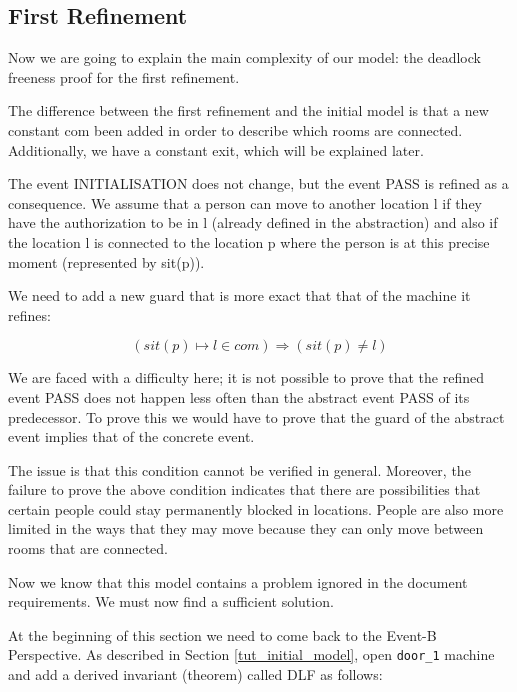 \subsection{First Refinement}
\label{tut_location_first_refinement}

Now we are going to explain the main complexity of our model: the deadlock freeness proof for the first refinement. 

The difference between the first refinement and the initial model is that a new constant \textsf{com} been added in order to describe which rooms are connected. Additionally, we have a constant \textsf{exit}, which will be explained later. 

The event \textsf{INITIALISATION} does not change, but the event \textsf{PASS} is refined as a consequence. We assume that a person can move to another location l if they have the authorization to be in l (already defined in the abstraction) and also if the location l is connected to the location p where the person is at this precise moment (represented by sit(p)).

We need to add a new guard that is more exact that that of the machine it refines:

\[
( sit(p) \mapsto l \in com ) \Rightarrow ( sit(p)\neq l )
\]

We are faced with a difficulty here; it is not possible to prove that the refined event \textsf{PASS} does not happen less often than the abstract event \textsf{PASS} of its predecessor. To prove this we would have to prove that the guard of the abstract event implies that of the concrete event.

The issue is that this condition cannot be verified in general. Moreover, the failure to prove the above condition indicates that there are possibilities that certain people could stay permanently blocked in locations. People are also more limited in the ways that they may move because they can only move between rooms that are connected.

Now we know that this model contains a problem ignored in the document requirements. We must now find a sufficient solution.


At the beginning of this section we need to come back to the \textsf{Event-B Perspective}. As described in Section \ref{tut_initial_model}, open \texttt{door\_1} machine and add a derived invariant (theorem) called \textsf{DLF} as follows: 

